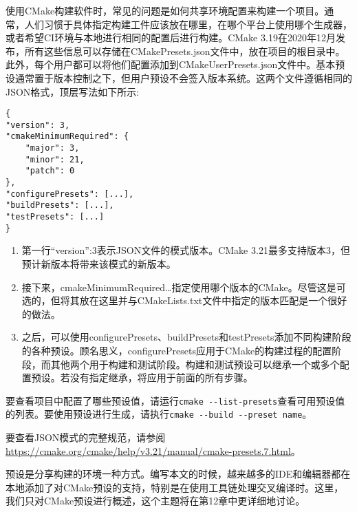 使用CMake构建软件时，常见的问题是如何共享环境配置来构建一个项目。通常，人们习惯于具体指定构建工件应该放在哪里，在哪个平台上使用哪个生成器，或者希望CI环境与本地进行相同的配置后进行构建。CMake 3.19在2020年12月发布，所有这些信息可以存储在CMakePresets.json文件中，放在项目的根目录中。此外，每个用户都可以将他们配置添加到CMakeUserPresets.json文件中。基本预设通常置于版本控制之下，但用户预设不会签入版本系统。这两个文件遵循相同的JSON格式，顶层写法如下所示:

\begin{lstlisting}[style=styleCMake]
{
"version": 3,
"cmakeMinimumRequired": {
	"major": 3,
	"minor": 21,
	"patch": 0
},
"configurePresets": [...],
"buildPresets": [...],
"testPresets": [...]
}
\end{lstlisting}

\begin{enumerate}
\item 
第一行“version”:3表示JSON文件的模式版本。CMake 3.21最多支持版本3，但预计新版本将带来该模式的新版本。

\item 
接下来，cmakeMinimumRequired{…}指定使用哪个版本的CMake。尽管这是可选的，但将其放在这里并与CMakeLists.txt文件中指定的版本匹配是一个很好的做法。

\item 
之后，可以使用configurePresets、buildPresets和testPresets添加不同构建阶段的各种预设。顾名思义，configurePresets应用于CMake的构建过程的配置阶段，而其他两个用于构建和测试阶段。构建和测试预设可以继承一个或多个配置预设。若没有指定继承，将应用于前面的所有步骤。
\end{enumerate}

要查看项目中配置了哪些预设值，请运行\texttt{cmake -{}-list-presets}查看可用预设值的列表。要使用预设进行生成，请执行\texttt{cmake -{}-build -{}-preset name}。

要查看JSON模式的完整规范，请参阅\url{https://cmake.org/cmake/help/v3.21/manual/cmake-presets.7.html}。

预设是分享构建的环境一种方式。编写本文的时候，越来越多的IDE和编辑器都在本地添加了对CMake预设的支持，特别是在使用工具链处理交叉编译时。这里，我们只对CMake预设进行概述，这个主题将在第12章中更详细地讨论。









































